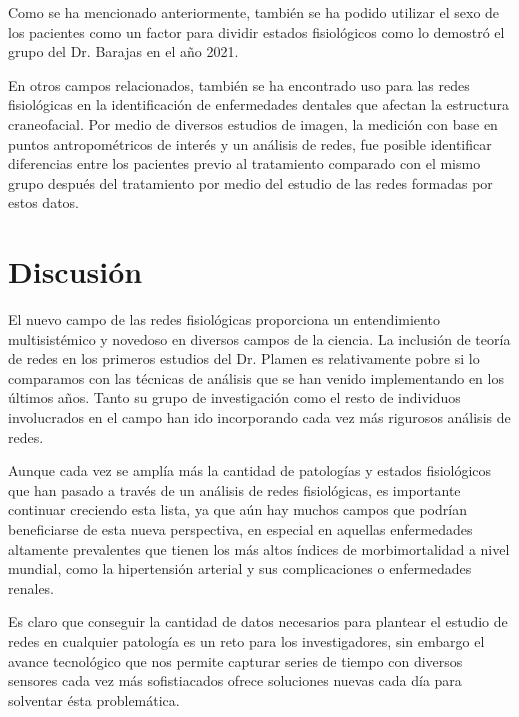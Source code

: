 \documentclass[twoside,twocolumn]{article}
\begin{document}
Como se ha mencionado anteriormente, también se ha podido utilizar el sexo de los pacientes como un factor para dividir estados fisiológicos como lo demostró el grupo del Dr. Barajas en el año 2021\cite{barajas2021sex}.

En otros campos relacionados, también se ha encontrado uso para las redes fisiológicas en la identificación de enfermedades dentales que afectan la estructura craneofacial\cites{scala2014complex}.
Por medio de diversos estudios de imagen, la medición con base en puntos antropométricos de interés y un análisis de redes, fue posible identificar diferencias entre los pacientes previo al tratamiento comparado con el mismo grupo después del tratamiento por medio del estudio de las redes formadas por estos datos.

\section{Discusión}
El nuevo campo de las redes fisiológicas proporciona un entendimiento multisistémico y novedoso en diversos campos de la ciencia.
La inclusión de teoría de redes en los primeros estudios del Dr. Plamen es relativamente pobre si lo comparamos con las técnicas de análisis que se han venido implementando en los últimos años.
Tanto su grupo de investigación como el resto de individuos involucrados en el campo han ido incorporando cada vez más rigurosos análisis de redes.

Aunque cada vez se amplía más la cantidad de patologías y estados fisiológicos que han pasado a través de un análisis de redes fisiológicas, es importante continuar creciendo esta lista, ya que aún hay muchos campos que podrían beneficiarse de esta nueva perspectiva, en especial en aquellas enfermedades altamente prevalentes que tienen los más altos índices de morbimortalidad a nivel mundial, como la hipertensión arterial y sus complicaciones o enfermedades renales.

Es claro que conseguir la cantidad de datos necesarios para plantear el estudio de redes en cualquier patología es un reto para los investigadores, sin embargo el avance tecnológico que nos permite capturar series de tiempo con diversos sensores cada vez más sofistiacados ofrece soluciones nuevas cada día para solventar ésta problemática.
\end{document}
